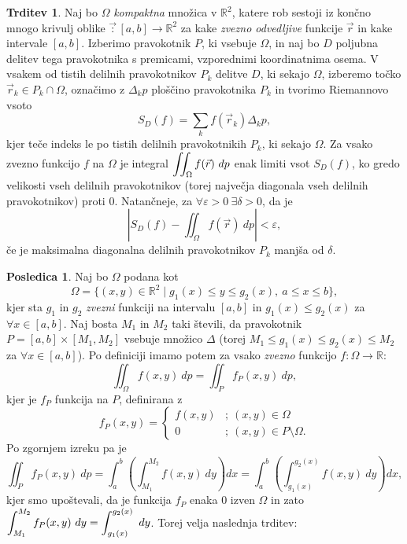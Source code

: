 \documentclass[11pt]{article}
\theoremstyle{definition}
\theoremstyle{definition}
\newtheorem{trditev}{Trditev}[section]
\theoremstyle{definition}
\newtheorem*{posledica}{Posledica}
\begin{document}
\begin{trditev}

Naj bo $\Omega$ \textit{kompaktna} množica v $\mathbb{R}^2$, katere rob sestoji iz končno mnogo krivulj oblike $\vec:[a, b] \rightarrow \mathbb{R}^2$ za kake \textit{zvezno odvedljive} funkcije $\vec{r}$ in kake intervale $[a, b]$. Izberimo pravokotnik $P$, ki vsebuje $\Omega$, in naj bo $D$ poljubna delitev tega pravokotnika s premicami, vzporednimi koordinatnima osema. V vsakem od tistih delilnih pravokotnikov $P_k$ delitve $D$, ki sekajo $\Omega$, izberemo točko $\vec{r}_k \in P_k \cap \Omega$, označimo z $\Delta_k p$ ploščino pravokotnika $P_k$ in tvorimo Riemannovo vsoto
$$S_D(f) = \sum_k f(\vec{r}_k) \Delta_k p,$$
kjer teče indeks le po tistih delilnih pravokotnikih $P_k$, ki sekajo $\Omega$. Za vsako zvezno funkcijo $f$ na $\Omega$ je integral $\mathlarger{\iint_\Omega f(\vec{r}) ~dp}$ enak limiti vsot $S_D(f)$, ko gredo velikosti vseh delilnih pravokotnikov (torej največja diagonala vseh delilnih pravokotnikov) proti $0$. Natančneje, za $\forall \varepsilon > 0 ~\exists \delta > 0$, da je
$$\left| S_D(f) - \iint_\Omega f(\vec{r}) ~dp \right| < \varepsilon,$$
če je maksimalna diagonalna delilnih pravokotnikov $P_k$ manjša od $\delta$.

\end{trditev}
\vspace{0.5cm}

\begin{posledica}

Naj bo $\Omega$ podana kot
\begin{equation} \label{eq:6}
	\Omega = \{ (x, y) \in \mathbb{R}^2 \mid g_1(x) \leq y \leq g_2(x), ~a \leq x \leq b \},
\end{equation}
kjer sta $g_1$ in $g_2$ \textit{zvezni} funkciji na intervalu $[a, b]$ in $g_1(x) \leq g_2(x)$ za $\forall x \in [a, b]$. Naj bosta $M_1$ in $M_2$ taki števili, da pravokotnik $P = [a, b] \times [M_1, M_2]$ vsebuje množico $\Delta$ (torej $M_1 \leq g_1(x) \leq g_2(x) \leq M_2$ za $\forall x \in [a, b]$). Po definiciji imamo potem za vsako \textit{zvezno} funkcijo $f: \Omega \rightarrow \mathbb{R}$:
$$\iint_\Omega f(x, y) ~dp = \iint_P f_P(x, y) ~dp,$$
kjer je $f_P$ funkcija na $P$, definirana z 
$$f_P(x, y) = 
\begin{cases}
	f(x, y) &; ~(x, y) \in \Omega \\
	0 &; ~(x, y) \in P \setminus \Omega.
\end{cases}$$
Po zgornjem izreku pa je
$$\iint_P f_P(x, y) ~dp = \int_a^b \left( \int_{M_1}^{M_2} f(x, y) ~dy \right) dx = \int_a^b \left( \int_{g_1(x)}^{g_2(x)} f(x, y) ~dy \right) dx,$$
kjer smo upoštevali, da je funkcija $f_P$ enaka $0$ izven $\Omega$ in zato $\mathlarger{\int_{M_1}^{M_2} f_P(x, y) ~dy = \int_{g_1(x)}^{g_2(x)} ~dy}$. Torej velja naslednja trditev:

\end{posledica}
\vspace{0.5cm}
\end{document}
